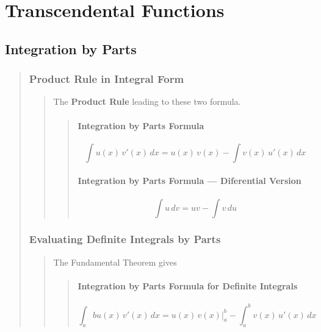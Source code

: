\documentclass{report}
\begin{document}

\chapter{Transcendental  Functions}
\setcounter{section}{1}


\section{Integration by Parts}
\begin{quote}

	\subsection{Product Rule in Integral Form}
	\begin{quote}
		The \textbf{Product Rule} leading to these two formula.

		\begin{quote}
			\subsubsection{Integration by Parts Formula}
			$$\int u(x)\, v'(x) \,dx =u(x)\,v(x)-\int v(x)\,u'(x)\,dx$$

			\subsubsection{Integration by Parts Formula — Diferential Version}
			$$\int u\,{dv} = uv - \int v\,{du}$$

		\end{quote}

	\end{quote}

	\subsection{Evaluating Definite Integrals by Parts	}
	\begin{quote}

		The Fundamental Theorem gives 
		
		\begin{quote}
		\subsubsection{Integration by Parts Formula for Deﬁnite Integrals }
		$$\int_{a}{b}u(x)\,v'(x)\,dx = u(x)\,v(x) \bigg |_{a}^{b} - \int_{a}^{b}v(x)\, u'(x)\, dx $$
		\end{quote}

	\end{quote}
\end{quote}
\end{document}
